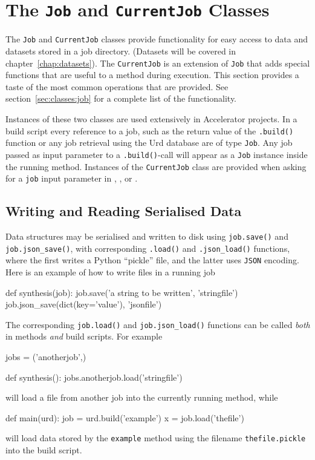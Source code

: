 \section{The \texttt{Job} and \texttt{CurrentJob} Classes}
The \texttt{Job} and \texttt{CurrentJob} classes provide functionality
for easy access to data and datasets stored in a job directory.
(Datasets will be covered in chapter~\ref{chap:datasets}).
The \texttt{CurrentJob} is an extension of \texttt{Job} that adds
special functions that are useful to a method during execution.  This
section provides a taste of the most common operations that are
provided.  See section~\ref{sec:classes:job} for a complete list of
the functionality.

Instances of these two classes are used extensively in Accelerator
projects.  In a build script every reference to a job, such as the
return value of the
\texttt{.build()} function or any job retrieval using the Urd database
are of type \texttt{Job}.  Any job passed as input parameter to a
\texttt{.build()}-call will appear as a \texttt{Job} instance inside
the running method.  Instances of the \texttt{CurrentJob} class are
provided when asking for a \texttt{job} input parameter in
\prepare, \analysis, or \synthesis.


\subsection{Writing and Reading Serialised Data}
Data structures may be serialised and written to disk using
\texttt{job.save()} and \texttt{job.json\_save()}, with corresponding
\texttt{.load()} and \texttt{.json\_load()} functions, where the first writes a
Python ``pickle'' file, and the latter uses \texttt{JSON} encoding.
Here is an example of how to write files in a running job
\begin{python}
def synthesis(job):
   job.save('a string to be written', 'stringfile')
   job.json_save(dict(key='value'), 'jsonfile')
\end{python}
The corresponding \texttt{job.load()} and \texttt{job.json\_load()}
functions can be called \textsl{both} in methods \textsl{and} build
scripts.  For example
\begin{python}
jobs = ('anotherjob',)

def synthesis():
    jobs.anotherjob.load('stringfile')
\end{python}
will load a file from another job into the currently running method, while
\begin{python}
def main(urd):
    job = urd.build('example')
    x = job.load('thefile')
\end{python}
will load data stored by the \texttt{example} method using the
filename \texttt{thefile.pickle} into the build script.


